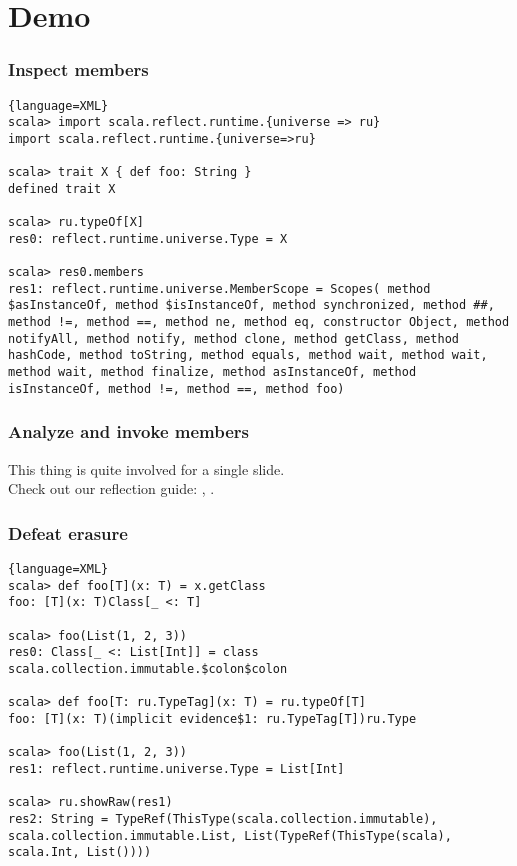 \documentclass[hyperref={bookmarks=false}]{beamer}
\begin{document}
\section{Demo}

\begin{frame}[fragile]
\frametitle{Inspect members}

\begin{lstlisting}{language=XML}
scala> import scala.reflect.runtime.{universe => ru}
import scala.reflect.runtime.{universe=>ru}

scala> trait X { def foo: String }
defined trait X

scala> ru.typeOf[X]
res0: reflect.runtime.universe.Type = X

scala> res0.members
res1: reflect.runtime.universe.MemberScope = Scopes( method $asInstanceOf, method $isInstanceOf, method synchronized, method ##, method !=, method ==, method ne, method eq, constructor Object, method notifyAll, method notify, method clone, method getClass, method hashCode, method toString, method equals, method wait, method wait, method wait, method finalize, method asInstanceOf, method isInstanceOf, method !=, method ==, method foo)
\end{lstlisting}
\end{frame}

\begin{frame}[fragile]
\frametitle{Analyze and invoke members}

This thing is quite involved for a single slide.\\ Check out our reflection guide: , .
\end{frame}

\begin{frame}[fragile]
\frametitle{Defeat erasure}

\begin{lstlisting}{language=XML}
scala> def foo[T](x: T) = x.getClass
foo: [T](x: T)Class[_ <: T]

scala> foo(List(1, 2, 3))
res0: Class[_ <: List[Int]] = class scala.collection.immutable.$colon$colon

scala> def foo[T: ru.TypeTag](x: T) = ru.typeOf[T]
foo: [T](x: T)(implicit evidence$1: ru.TypeTag[T])ru.Type

scala> foo(List(1, 2, 3))
res1: reflect.runtime.universe.Type = List[Int]

scala> ru.showRaw(res1)
res2: String = TypeRef(ThisType(scala.collection.immutable), scala.collection.immutable.List, List(TypeRef(ThisType(scala), scala.Int, List())))
\end{lstlisting}
\end{frame}
\end{document}
